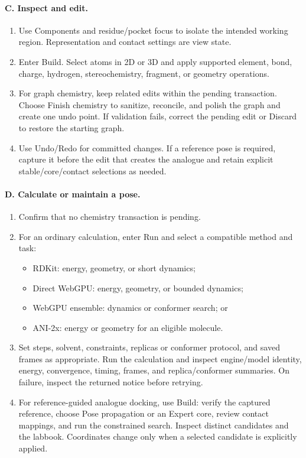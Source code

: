 \documentclass[11pt]{article}
\begin{document}
\begin{small}
\paragraph{C. Inspect and edit.}
\begin{enumerate}[leftmargin=*]
\item Use Components and residue/pocket focus to isolate the intended working region. Representation and contact settings are view state.
\item Enter Build. Select atoms in 2D or 3D and apply supported element, bond, charge, hydrogen, stereochemistry, fragment, or geometry operations.
\item For graph chemistry, keep related edits within the pending transaction. Choose Finish chemistry to sanitize, reconcile, and polish the graph and create one undo point. If validation fails, correct the pending edit or Discard to restore the starting graph.
\item Use Undo/Redo for committed changes. If a reference pose is required, capture it before the edit that creates the analogue and retain explicit stable/core/contact selections as needed.
\end{enumerate}

\paragraph{D. Calculate or maintain a pose.}
\begin{enumerate}[leftmargin=*]
\item Confirm that no chemistry transaction is pending.
\item For an ordinary calculation, enter Run and select a compatible method and task:
  \begin{itemize}
  \item RDKit: energy, geometry, or short dynamics;
  \item Direct WebGPU: energy, geometry, or bounded dynamics;
  \item WebGPU ensemble: dynamics or conformer search; or
  \item ANI-2x: energy or geometry for an eligible molecule.
  \end{itemize}
\item Set steps, solvent, constraints, replicas or conformer protocol, and saved frames as appropriate. Run the calculation and inspect engine/model identity, energy, convergence, timing, frames, and replica/conformer summaries. On failure, inspect the returned notice before retrying.
\item For reference-guided analogue docking, use Build: verify the captured reference, choose Pose propagation or an Expert core, review contact mappings, and run the constrained search. Inspect distinct candidates and the labbook. Coordinates change only when a selected candidate is explicitly applied.
\end{enumerate}


\end{small}
\end{document}
